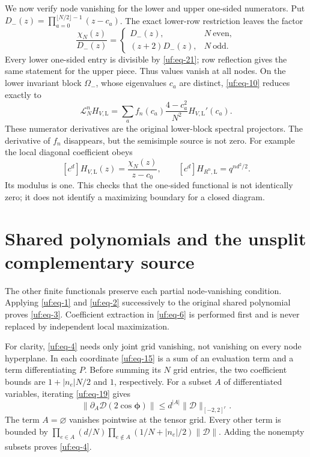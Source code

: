 We now verify node vanishing for the lower and upper one-sided numerators. Put
\(D_-(z)=\prod_{a=0}^{\lfloor N/2\rfloor-1}(z-c_a)\). The exact
lower-row restriction leaves the factor \begin{equation}\label{uf:eq-21}
\frac{\chi_N(z)}{D_-(z)}=
 \begin{cases}D_-(z),&N\ \mathrm{even},\\
 (z+2)D_-(z),&N\ \mathrm{odd}.
 \end{cases}
\end{equation} Every lower one-sided entry is divisible by \eqref{uf:eq-21}; row
reflection gives the same statement for the upper piece. Thus values
vanish at all nodes. On the lower invariant block \(\Omega_-\), whose
eigenvalues \(c_a\) are distinct, \eqref{uf:eq-10} reduces exactly to \begin{equation}\label{uf:eq-22}
\mathcal L_N^nH_{V,\mathrm L}
 =\sum_a f_n(c_a)\frac{4-c_a^2}{N^2}
                       H_{V,\mathrm L}'(c_a).
\end{equation} These numerator derivatives are the original lower-block spectral
projectors. The derivative of \(f_n\) disappears, but the semisimple
source is not zero. For example the local diagonal coefficient
obeys \begin{equation}\label{uf:eq-23}
[c^d]H_{V,\mathrm L}(z)=\frac{\chi_N(z)}{z-c_0},
 \qquad [c^d]H_{R^n,\mathrm L}=q^{nd^2/2}.
\end{equation} Its modulus is one. This checks that the one-sided functional is
not identically zero; it does not identify a maximizing boundary
for a closed diagram.

\section{Shared polynomials and the unsplit complementary
source}\label{uf:sec-shared-polynomials-and-the-unsplit-complementary-source}

The other finite functionals preserve each partial node-vanishing
condition. Applying \eqref{uf:eq-1} and \eqref{uf:eq-2} successively to the original shared
polynomial proves \eqref{uf:eq-3}. Coefficient extraction in \eqref{uf:eq-6} is performed first
and is never replaced by independent local maximization.

For clarity, \eqref{uf:eq-4} needs only joint grid vanishing, not vanishing on every
node hyperplane. In each coordinate \eqref{uf:eq-15} is a sum of an evaluation term
and a term differentiating \(P\). Before summing its \(N\) grid entries,
the two coefficient bounds are \(1+|n_e|N/2\) and \(1\), respectively.
For a subset \(A\) of differentiated variables, iterating \eqref{uf:eq-19} gives \begin{equation}\label{uf:eq-24}
\|\partial_A\mathcal D(2\cos\boldsymbol\phi)\|
                  \le d^{|A|}\|\mathcal D\|_{[-2,2]^r}.
\end{equation} The term \(A=\varnothing\) vanishes pointwise at the tensor grid.
Every other term is bounded by
\(\prod_{e\in A}(d/N)\prod_{e\notin A}(1/N+|n_e|/2)\|\mathcal D\|\).
Adding the nonempty subsets proves \eqref{uf:eq-4}.

